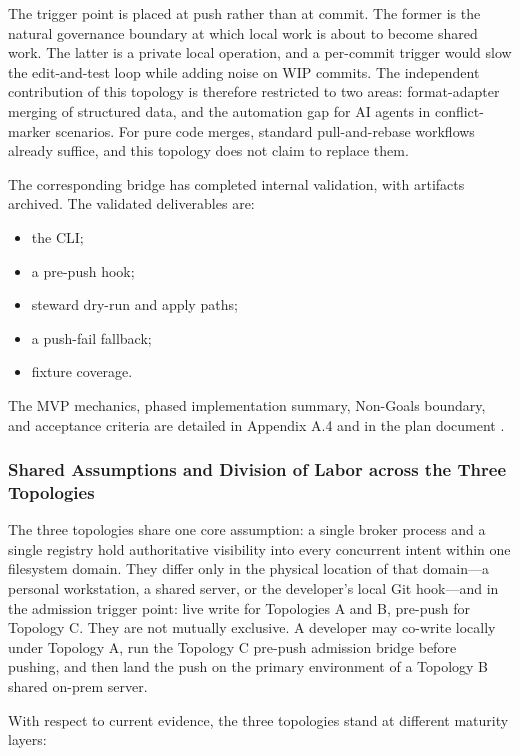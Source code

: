 \documentclass[9pt,letterpaper]{extarticle}
\begin{document}
The trigger point is placed at push rather than at commit. The former is the natural governance boundary at which local work is about to become shared work. The latter is a private local operation, and a per-commit trigger would slow the edit-and-test loop while adding noise on WIP commits. The independent contribution of this topology is therefore restricted to two areas: format-adapter merging of structured data, and the automation gap for AI agents in conflict-marker scenarios. For pure code merges, standard pull-and-rebase workflows already suffice, and this topology does not claim to replace them.

The corresponding bridge has completed internal validation, with artifacts archived. The validated deliverables are:

\begin{itemize}
\item the \texttt{} CLI;
\item a pre-push hook;
\item steward dry-run and apply paths;
\item a push-fail fallback;
\item fixture coverage.
\end{itemize}

The MVP mechanics, phased implementation summary, Non-Goals boundary, and acceptance criteria are detailed in Appendix A.4 and in the plan document \texttt{}.

\subsubsection*{Shared Assumptions and Division of Labor across the Three Topologies}

The three topologies share one core assumption: a single broker process and a single registry hold authoritative visibility into every concurrent intent within one filesystem domain. They differ only in the physical location of that domain---a personal workstation, a shared server, or the developer's local Git hook---and in the admission trigger point: live write for Topologies A and B, pre-push for Topology C. They are not mutually exclusive. A developer may co-write locally under Topology A, run the Topology C pre-push admission bridge before pushing, and then land the push on the primary environment of a Topology B shared on-prem server.

With respect to current evidence, the three topologies stand at different maturity layers:
\end{document}
